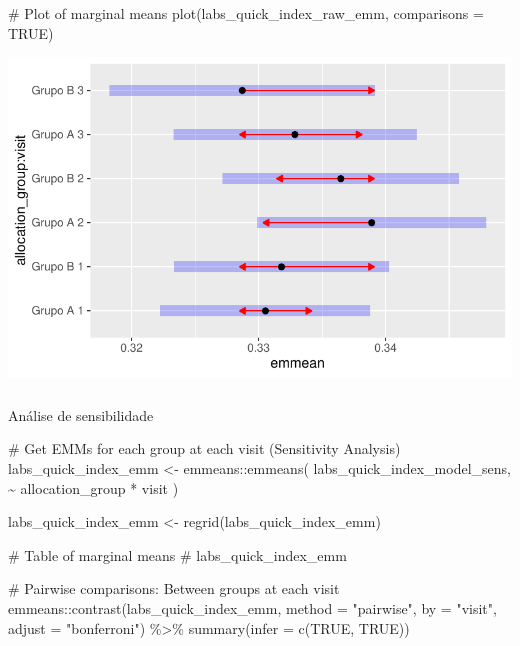 \documentclass[
  12pt,
]{article}
\makeatletter
\let\oldsubparagraph\subparagraph
\renewcommand{\subparagraph}{
    \@ifstar
      \xxxSubParagraphStar
      \xxxSubParagraphNoStar
  }
\newcommand{\xxxSubParagraphStar}[1]{\oldsubparagraph*{#1}\mbox{}}
\newcommand{\xxxSubParagraphNoStar}[1]{\oldsubparagraph{#1}\mbox{}}
\newenvironment{Shaded}{\begin{snugshade}}{\end{snugshade}}
\newcommand{\AttributeTok}[1]{\textcolor[rgb]{0.40,0.45,0.13}{#1}}
\newcommand{\CommentTok}[1]{\textcolor[rgb]{0.37,0.37,0.37}{#1}}
\newcommand{\ConstantTok}[1]{\textcolor[rgb]{0.56,0.35,0.01}{#1}}
\newcommand{\FunctionTok}[1]{\textcolor[rgb]{0.28,0.35,0.67}{#1}}
\newcommand{\NormalTok}[1]{\textcolor[rgb]{0.00,0.23,0.31}{#1}}
\newcommand{\OtherTok}[1]{\textcolor[rgb]{0.00,0.23,0.31}{#1}}
\newcommand{\SpecialCharTok}[1]{\textcolor[rgb]{0.37,0.37,0.37}{#1}}
\newcommand{\StringTok}[1]{\textcolor[rgb]{0.13,0.47,0.30}{#1}}
\makeatother
\begin{document}
\begin{Shaded}
\begin{Highlighting}[]
\CommentTok{\# Plot of marginal means}
\FunctionTok{plot}\NormalTok{(labs\_quick\_index\_raw\_emm, }\AttributeTok{comparisons =} \ConstantTok{TRUE}\NormalTok{)}
\end{Highlighting}
\end{Shaded}

\includegraphics{Outcomes_files/figure-pdf/labs_quick_index_raw_emm-1.pdf}

\subparagraph{Análise de
sensibilidade}\label{anuxe1lise-de-sensibilidade-12}

\begin{Shaded}
\begin{Highlighting}[]
\CommentTok{\# Get EMMs for each group at each visit (Sensitivity Analysis)}
\NormalTok{labs\_quick\_index\_emm }\OtherTok{\textless{}{-}}\NormalTok{ emmeans}\SpecialCharTok{::}\FunctionTok{emmeans}\NormalTok{(}
\NormalTok{    labs\_quick\_index\_model\_sens, }
    \SpecialCharTok{\textasciitilde{}}\NormalTok{ allocation\_group }\SpecialCharTok{*}\NormalTok{ visit}
\NormalTok{)}

\NormalTok{labs\_quick\_index\_emm }\OtherTok{\textless{}{-}} \FunctionTok{regrid}\NormalTok{(labs\_quick\_index\_emm)}

\CommentTok{\# Table of marginal means}
\CommentTok{\# labs\_quick\_index\_emm}

\CommentTok{\# Pairwise comparisons: Between groups at each visit}
\NormalTok{emmeans}\SpecialCharTok{::}\FunctionTok{contrast}\NormalTok{(labs\_quick\_index\_emm,}
\AttributeTok{method =} \StringTok{"pairwise"}\NormalTok{, }\AttributeTok{by =} \StringTok{"visit"}\NormalTok{,}
\AttributeTok{adjust =} \StringTok{"bonferroni"}\NormalTok{) }\SpecialCharTok{\%\textgreater{}\%} \FunctionTok{summary}\NormalTok{(}\AttributeTok{infer =} \FunctionTok{c}\NormalTok{(}\ConstantTok{TRUE}\NormalTok{, }\ConstantTok{TRUE}\NormalTok{))}
\end{Highlighting}
\end{Shaded}
\end{document}
